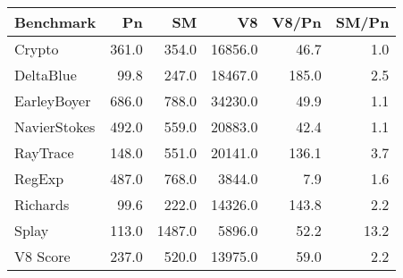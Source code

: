 \begin{tabular}{|l|r|r|r|r|r|}
  \hline
  Benchmark & Pn & SM & V8 & V8/Pn & SM/Pn \\
  \hline \hline
  Crypto & 361.0 & 354.0 & 16856.0 & 46.7 & 1.0\\
  \hline
  DeltaBlue & 99.8 & 247.0 & 18467.0 & 185.0 & 2.5\\
  \hline
  EarleyBoyer & 686.0 & 788.0 & 34230.0 & 49.9 & 1.1\\
  \hline
  NavierStokes & 492.0 & 559.0 & 20883.0 & 42.4 & 1.1\\
  \hline
  RayTrace & 148.0 & 551.0 & 20141.0 & 136.1 & 3.7\\
  \hline
  RegExp & 487.0 & 768.0 & 3844.0 & 7.9 & 1.6\\
  \hline
  Richards & 99.6 & 222.0 & 14326.0 & 143.8 & 2.2\\
  \hline
  Splay & 113.0 & 1487.0 & 5896.0 & 52.2 & 13.2\\
  \hline
  \hline
  V8 Score & 237.0 & 520.0 & 13975.0 & 59.0 & 2.2\\
  \hline
\end{tabular}
